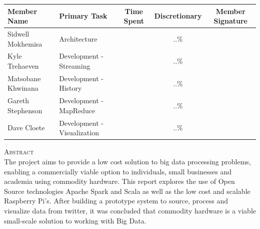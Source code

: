 \documentclass[12pt]{article} %
\begin{document}
		\begin{center}
			\begin{tabular}{ | p{3cm} | p{3cm} | c | c | c |}
				\hline
				\textbf {Member Name} & \textbf {Primary Task} & \textbf {Time Spent} & \textbf {Discretionary} & \textbf {Member Signature}  \\
				\hline
				Sidwell Mokhemisa & Architecture & & ..\% & \\
				\hline
				Kyle Trehaeven & Development - Streaming &  & ..\% & \\
				\hline
				Matsobane Khwinana & Development - History & & ..\% & \\
				\hline
				Gareth Stephenson & Development - MapReduce & & ..\% & \\
				\hline
				Dave Cloete & Development - Visualization & & ..\% &\\
				\hline
			\end{tabular}
		\end{center}
		
		
		
		\newpage
		
		\begin{flushleft}\large
			\textsc{Abstract}\\
			The project aims to provide a low cost solution to big data processing problems, enabling a commercially viable option to individuals, small businesses and academia using commodity hardware. This report explores the use of  Open Source technologies Apache Spark and Scala as well as the low cost and scalable Raspberry Pi's. After building a prototype system to source, process and visualize data from twitter, it was concluded that  commodity hardware is a viable small-scale solution to working with Big Data.
			
		\end{flushleft}
	
		
	
		
		\newpage
	
	
\end{document}
